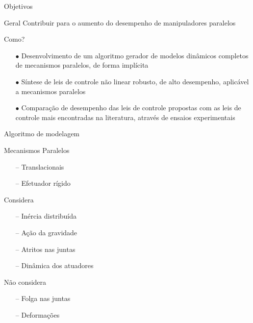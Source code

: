 \documentclass[25pt,landscape]{beamer}
\begin{document}
\begin{frame}{Objetivos}
	\pause
	\begin{block}{Geral}
		Contribuir para o aumento do desempenho de manipuladores paralelos
	\end{block}
	\pause
	\begin{exampleblock}{Como?}
		\pause
		\begin{itemize}
			\item[$\bullet$] Desenvolvimento de um algoritmo gerador de modelos din\^amicos completos de mecanismos paralelos, de forma impl\'icita \\[8pt]
			\pause
			\item[$\bullet$] S\'intese de leis de controle  n\~ao linear robusto, de alto desempenho, aplic\'avel a mecanismos paralelos \\[8pt]
			\pause
			\item[$\bullet$] Compara\c{c}\~ao de desempenho das leis de controle propostas com as leis de controle mais encontradas na literatura, atrav\'es de ensaios experimentais \\[8pt]
		\end{itemize}
	\end{exampleblock}
\end{frame}

\begin{frame}{Algoritmo de modelagem}
    \pause
    \begin{block}{Mecanismos Paralelos}
        \begin{itemize}
            \item[--] Translacionais \\[4pt]
            \item[--] Efetuador r\'igido \\[4pt]
        \end{itemize}
    \end{block}
    \pause
    \begin{block}{Considera}
        \begin{itemize}
            \item[--] In\'ercia distribu\'ida \\[4pt]
            \item[--] A\c{c}\~ao da gravidade \\[4pt]
            \item[--] Atritos nas juntas \\[4pt]
            \item[--] Din\^amica dos atuadores \\[4pt]
        \end{itemize}
    \end{block}
    \pause
    \begin{block}{N\~ao considera}
        \begin{itemize}
            \item[--] Folga nas juntas \\[4pt]
            \item[--] Deforma\c{c}\~oes \\[4pt]
        \end{itemize}
    \end{block}
\end{frame}
\end{document}
